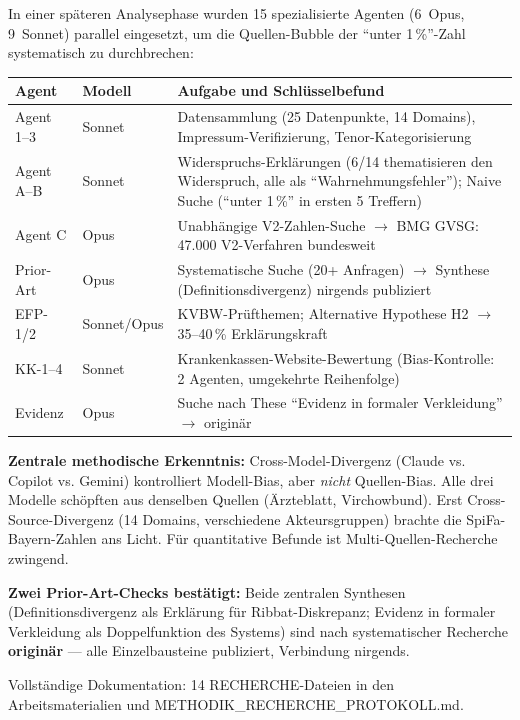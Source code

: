 \documentclass{umbruch-position}
\begin{document}
In einer späteren Analysephase wurden 15 spezialisierte Agenten (6~Opus, 9~Sonnet) parallel eingesetzt, um die Quellen-Bubble der ``unter 1\,\%''-Zahl systematisch zu durchbrechen:

{\small
\begin{tabularx}{\textwidth}{l l X}
\toprule
\textbf{Agent} & \textbf{Modell} & \textbf{Aufgabe und Schlüsselbefund} \\
\midrule
Agent 1--3 & Sonnet & Datensammlung (25 Datenpunkte, 14 Domains), Impressum-Verifizierung, Tenor-Kategorisierung \\
\addlinespace
Agent A--B & Sonnet & Widerspruchs-Erklärungen (6/14 thematisieren den Widerspruch, alle als ``Wahrnehmungsfehler''); Naive Suche (``unter 1\,\%'' in ersten 5 Treffern) \\
\addlinespace
Agent C & Opus & Unabhängige V2-Zahlen-Suche $\to$ BMG GVSG: 47.000 V2-Verfahren bundesweit \\
\addlinespace
Prior-Art & Opus & Systematische Suche (20+ Anfragen) $\to$ Synthese (Definitionsdivergenz) nirgends publiziert \\
\addlinespace
EFP-1/2 & Sonnet/Opus & KVBW-Prüfthemen; Alternative Hypothese H2 $\to$ 35--40\,\% Erklärungskraft \\
\addlinespace
KK-1--4 & Sonnet & Krankenkassen-Website-Bewertung (Bias-Kontrolle: 2 Agenten, umgekehrte Reihenfolge) \\
\addlinespace
Evidenz & Opus & Suche nach These ``Evidenz in formaler Verkleidung'' $\to$ originär \\
\bottomrule
\end{tabularx}
}

\textbf{Zentrale methodische Erkenntnis:} Cross-Model-Divergenz (Claude vs. Copilot vs. Gemini) kontrolliert Modell-Bias, aber \textit{nicht} Quellen-Bias. Alle drei Modelle schöpften aus denselben Quellen (Ärzteblatt, Virchowbund). Erst Cross-Source-Divergenz (14 Domains, verschiedene Akteursgruppen) brachte die SpiFa-Bayern-Zahlen ans Licht. Für quantitative Befunde ist Multi-Quellen-Recherche zwingend.

\textbf{Zwei Prior-Art-Checks bestätigt:} Beide zentralen Synthesen (Definitionsdivergenz als Erklärung für Ribbat-Diskrepanz; Evidenz in formaler Verkleidung als Doppelfunktion des Systems) sind nach systematischer Recherche \textbf{originär} --- alle Einzelbausteine publiziert, Verbindung nirgends.

Vollständige Dokumentation: 14 RECHERCHE-Dateien in den Arbeitsmaterialien und METHODIK\_RECHERCHE\_PROTOKOLL.md.
\end{document}
